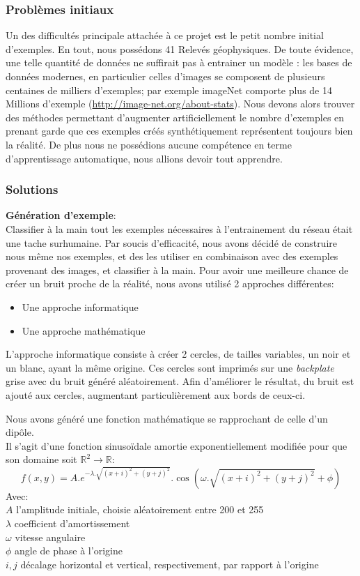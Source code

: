 \documentclass[a4paper, 12pt, titlepage, oneside, french]{article}
\begin{document}
	\newpage
	\subsubsection{Problèmes initiaux}
	Un des difficultés principale attachée à ce projet est le petit nombre initial d'exemples. En tout, nous possédons 41 Relevés géophysiques. De toute évidence, une telle quantité de données ne suffirait pas à entrainer un modèle : les bases de données modernes, en particulier celles d'images se composent de plusieurs centaines de milliers d'exemples; par exemple imageNet comporte plus de 14 Millions d'exemple (\url{http://image-net.org/about-stats}). Nous devons alors trouver des méthodes permettant d'augmenter artificiellement le nombre d'exemples en prenant garde que ces exemples créés synthétiquement représentent toujours bien la réalité. De plus nous ne possédions aucune compétence en terme d'apprentissage automatique, nous allions devoir tout apprendre. 
	\subsubsection{Solutions}
	\textbf{Génération d'exemple}:\\
	Classifier à la main tout les exemples nécessaires à l'entrainement du réseau était une tache surhumaine. Par soucis d'efficacité, nous avons décidé de construire nous même
	nos exemples, et des les utiliser en combinaison avec des exemples provenant des images, et classifier à la main.
	Pour avoir une meilleure chance de créer un bruit proche de la réalité, nous avons utilisé 2 approches différentes:
	\begin{itemize}
		\item Une approche informatique
		\item Une approche mathématique
	\end{itemize}
	L'approche informatique consiste à créer 2 cercles, de tailles variables, un noir et un blanc, ayant la même origine. Ces cercles sont imprimés sur une \textit{backplate} grise avec du bruit généré aléatoirement. Afin d'améliorer le résultat, du bruit est ajouté aux cercles, augmentant particulièrement aux bords de ceux-ci.

	Nous avons généré une fonction mathématique se rapprochant de celle d'un dipôle.\\
	Il s'agit d'une fonction sinusoïdale amortie exponentiellement modifiée pour que son domaine soit $\mathbb{R}^2 \to \mathbb{R}$:
	\[f(x,y) = A.e^{-\lambda . \sqrt{(x+i)^2+(y+j)^2}}.\cos(\omega . \sqrt{(x+i)^2+(y+j)^2} + \phi)\]
	Avec:\\
	\indent $A$ l'amplitude initiale, choisie aléatoirement entre 200 et 255\\
	\indent$\lambda$ coefficient d'amortissement\\
	\indent$\omega$ vitesse angulaire\\
	\indent$\phi$ angle de phase à l'origine\\
	\indent$i,j$ décalage horizontal et vertical, respectivement, par rapport à l'origine
\end{document}
